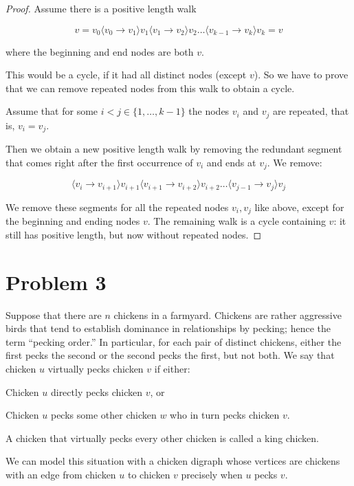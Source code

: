 \documentclass[14pt]{extarticle}
\begin{document}
\begin{proof}
Assume there is a positive length walk 

$$
v = v_0 \langle v_0 \rightarrow  v_1 \rangle v_1 \langle v_1 \rightarrow  v_2 \rangle v_2 \ldots \langle v_{k-1} \rightarrow  v_k \rangle v_k = v
$$ 

where the beginning and end nodes are both $v$.

This would be a cycle, if it had all distinct nodes (except $v$). So we have to prove that we can remove repeated nodes from this walk to obtain a cycle.

Assume that for some $i < j \in \{1, \ldots, k-1\}$ the nodes $v_i$ and $v_j$ are repeated, that is, $v_i = v_j$.

Then we obtain a new positive length walk by removing the redundant segment that comes right after the first occurrence of $v_i$ and ends at $v_j$. We remove:

$$
\langle v_i \rightarrow  v_{i+1} \rangle v_{i+1} \langle v_{i+1} \rightarrow  v_{i+2} \rangle v_{i+2} \ldots \langle v_{j-1} \rightarrow  v_j \rangle v_j
$$

We remove these segments for all the repeated nodes $v_i, v_j$ like above, except for the beginning and ending nodes $v$. The remaining walk is a cycle containing $v$: it still has positive length, but now without repeated nodes.
\end{proof}

\section{Problem 3}

Suppose that there are $n$ chickens in a farmyard. Chickens are rather aggressive birds that tend to establish dominance in relationships by pecking; hence the term “pecking order.” In particular, for each pair of distinct chickens, either the first pecks the second or the second pecks the first, but not both. We say that chicken $u$ virtually pecks chicken $v$ if either:

Chicken $u$ directly pecks chicken $v$, or

Chicken $u$ pecks some other chicken $w$ who in turn pecks chicken $v$.

A chicken that virtually pecks every other chicken is called a king chicken.

We can model this situation with a chicken digraph whose vertices are chickens with an edge from chicken $u$ to chicken $v$ precisely when $u$ pecks $v$. 
\end{document}
